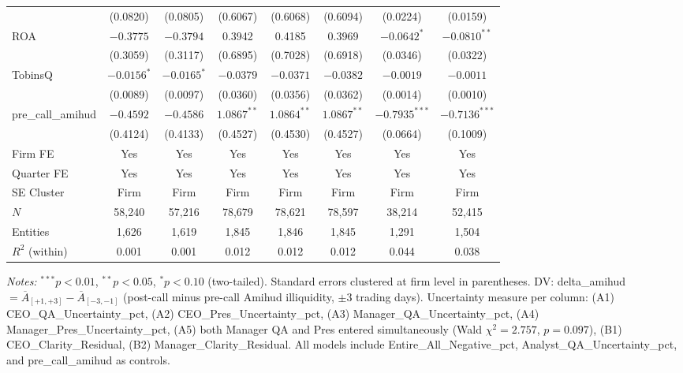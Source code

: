 \documentclass[12pt,a4paper]{article}
\begin{document}
\begin{table}[H]
\begin{threeparttable}
\begin{scriptsize}
\begin{tabular}{lccccccc}
 & (0.0820) & (0.0805) & (0.6067) & (0.6068) & (0.6094) & (0.0224) & (0.0159) \\[1pt]
ROA & $-0.3775$ & $-0.3794$ & 0.3942 & 0.4185 & 0.3969 & $\mathbf{-0.0642}^{*}$ & $\mathbf{-0.0810}^{**}$ \\
 & (0.3059) & (0.3117) & (0.6895) & (0.7028) & (0.6918) & (0.0346) & (0.0322) \\[1pt]
TobinsQ & $\mathbf{-0.0156}^{*}$ & $\mathbf{-0.0165}^{*}$ & $-0.0379$ & $-0.0371$ & $-0.0382$ & $-0.0019$ & $-0.0011$ \\
 & (0.0089) & (0.0097) & (0.0360) & (0.0356) & (0.0362) & (0.0014) & (0.0010) \\[1pt]
pre\_call\_amihud & $-0.4592$ & $-0.4586$ & $\mathbf{1.0867}^{**}$ & $\mathbf{1.0864}^{**}$ & $\mathbf{1.0867}^{**}$ & $\mathbf{-0.7935}^{***}$ & $\mathbf{-0.7136}^{***}$ \\
 & (0.4124) & (0.4133) & (0.4527) & (0.4530) & (0.4527) & (0.0664) & (0.1009) \\[1pt]
\midrule
Firm FE & Yes & Yes & Yes & Yes & Yes & Yes & Yes \\
Quarter FE & Yes & Yes & Yes & Yes & Yes & Yes & Yes \\
SE Cluster & Firm & Firm & Firm & Firm & Firm & Firm & Firm \\
$N$ & 58,240 & 57,216 & 78,679 & 78,621 & 78,597 & 38,214 & 52,415 \\
Entities & 1,626 & 1,619 & 1,845 & 1,846 & 1,845 & 1,291 & 1,504 \\
$R^2$ (within) & 0.001 & 0.001 & 0.012 & 0.012 & 0.012 & 0.044 & 0.038 \\
\bottomrule
\end{tabular}
\end{scriptsize}
\begin{tablenotes}[flushleft]
\footnotesize
\item \textit{Notes:} $^{***}p<0.01$, $^{**}p<0.05$, $^{*}p<0.10$ (two-tailed). Standard errors clustered at firm level in parentheses. DV: delta\_amihud $= \overline{A}_{[+1,+3]} - \overline{A}_{[-3,-1]}$ (post-call minus pre-call Amihud illiquidity, $\pm$3 trading days). Uncertainty measure per column: (A1) CEO\_QA\_Uncertainty\_pct, (A2) CEO\_Pres\_Uncertainty\_pct, (A3) Manager\_QA\_Uncertainty\_pct, (A4) Manager\_Pres\_Uncertainty\_pct, (A5) both Manager QA and Pres entered simultaneously (Wald $\chi^2 = 2.757$, $p = 0.097$), (B1) CEO\_Clarity\_Residual, (B2) Manager\_Clarity\_Residual. All models include Entire\_All\_Negative\_pct, Analyst\_QA\_Uncertainty\_pct, and pre\_call\_amihud as controls.
\end{tablenotes}
\end{threeparttable}
\end{table}
\end{document}

